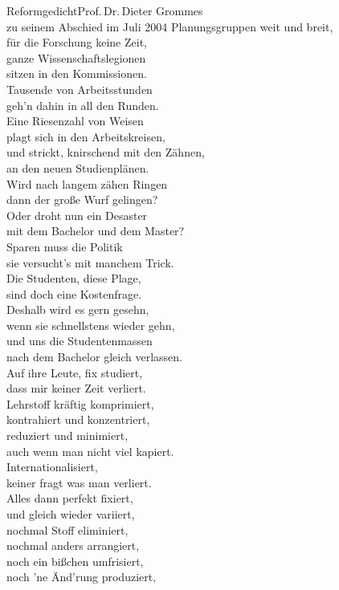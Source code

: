 \begin{lied*}{Reformgedicht}{Prof.\,Dr.\,Dieter Grommes\\zu seinem Abschied im Juli 2004}
Planungsgruppen weit und breit,\\
für die Forschung keine Zeit,\\
ganze Wissenschaftslegionen\\
sitzen in den Kommissionen.\\
Tausende von Arbeitsstunden\\
geh'n dahin in all den Runden.\\
Eine Riesenzahl von Weisen\\
plagt sich in den Arbeitskreisen,\\
und strickt, knirschend mit den Zähnen,\\
an den neuen Studienplänen.\\

Wird nach langem zähen Ringen\\
dann der große Wurf gelingen?\\
Oder droht nun ein Desaster\\
mit dem Bachelor und dem Master?\\

Sparen muss die Politik\\
sie versucht's mit manchem Trick.\\
Die Studenten, diese Plage,\\
sind doch eine Kostenfrage.\\
Deshalb wird es gern gesehn,\\
wenn sie schnellstens wieder gehn,\\
und uns die Studentenmassen\\
nach dem Bachelor gleich verlassen.\\

Auf ihre Leute, fix studiert,\\
dass mir keiner Zeit verliert.\\
Lehrstoff kräftig komprimiert,\\
kontrahiert und konzentriert,\\
reduziert und minimiert,\\
auch wenn man nicht viel kapiert.\\

Internationalisiert,\\
keiner fragt was man verliert.\\
Alles dann perfekt fixiert,\\
und gleich wieder variiert,\\
nochmal Stoff eliminiert,\\
nochmal anders arrangiert,\\
noch ein bißchen umfrisiert,\\
noch 'ne Änd'rung produziert,\\


\end{lied*}
